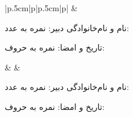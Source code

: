 {\begin{tabular}{|p{.5cm}|p{\colwidth}|p{.5cm}|p{\colwidth}|}
	&
	\parbox[b]{\linewidth}{%
		\vspace{5pt}
		نام و نام‌خانوادگی دبیر:
		\hfill
		نمره به عدد:
		\hspace*{1cm}\par\vspace{5pt}
		تاریخ و امضا:
		\hfill
		نمره به حروف:
		\hspace*{2.5cm}}
	&
	&	
	\parbox[b]{\linewidth}{%
		\vspace{5pt}
		نام و نام‌خانوادگی دبیر:
		\hfill
		نمره به عدد:
		\hspace*{1cm}\par\vspace{5pt}
		تاریخ و امضا:
		\hfill
		نمره به حروف:
		\hspace*{2.5cm}}
	\\ \hline
\end{tabular}%
}
